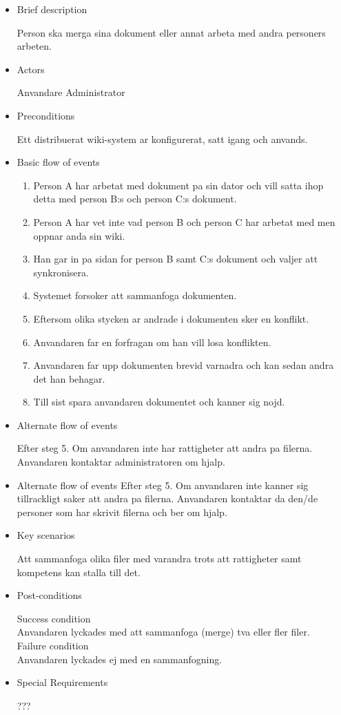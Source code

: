 \begin{itemize}
	\item Brief description
	
	Person ska merga sina dokument eller annat arbeta med andra personers arbeten.
	\item Actors
	
	Anvandare
	Administrator	
	\item Preconditions
	
	Ett distribuerat wiki-system ar konfigurerat, satt igang och anvands.
	\item Basic flow of events
	
	\begin{enumerate}
		\item Person A har arbetat med dokument pa sin dator och vill satta ihop detta med person B:s och person C:s dokument.
		\item Person A har vet inte vad person B och person C har arbetat med men oppnar anda sin wiki.
		\item Han gar in pa sidan for person B samt C:s dokument och valjer att synkronisera.
		\item Systemet forsoker att sammanfoga dokumenten.
		\item Eftersom olika stycken ar andrade i dokumenten sker en konflikt.
		\item Anvandaren far en forfragan om han vill losa konflikten.
		\item Anvandaren far upp dokumenten brevid varnadra och kan sedan andra det han behagar.
		\item Till sist spara anvandaren dokumentet och kanner sig nojd.
	\end{enumerate}
	\item Alternate flow of events
	
	Efter steg 5. Om anvandaren inte har rattigheter att andra pa filerna.
	Anvandaren kontaktar administratoren om hjalp.
	\item Alternate flow of events
	Efter steg 5. Om anvandaren inte kanner sig tillrackligt saker att andra pa filerna.
	Anvandaren kontaktar da den/de personer som har skrivit filerna och ber om hjalp.
	\item Key scenarios
	
	Att sammanfoga olika filer med varandra trots att rattigheter samt kompetens kan stalla till det.
	\item Post-conditions	
	
		Success condition 
		\\
		Anvandaren lyckades med att sammanfoga (merge) tva eller fler filer.
		\\
		Failure condition
		\\
		Anvandaren lyckades ej med en sammanfogning.
		
	\item Special Requirements
	
	???
\end{itemize}


